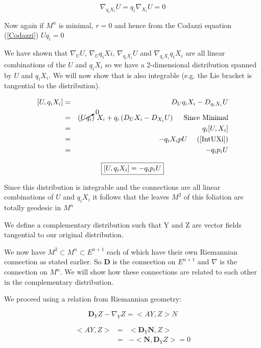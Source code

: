 \begin{equation}
\nabla_{q_iX_i}U = q_i\nabla_{X_i}U = 0
\label{NqiXiU}
\end{equation}

Now again if $M^n$ is minimal, $r=0$ and hence from the Codazzi equation (\ref{Codazzi}) $Uq_i=0$ 

We have shown that $\nabla_UU$, $\nabla_Uq_iXi$, $\nabla_{q_iX_i}U$ and $\nabla_{ q_iX_i}q_iX_i$ are all linear combinations of the $U$ and $q_iX_i$ so we have a 2-dimensional distribution spanned by $U$ and $q_iX_i$. We will now show that is also integrable (e.g. the Lie bracket is tangential to the distribution).

\begin{eqnarray}
\nonumber
[U,q_iX_i] &=& D_Uq_iX_i - D_{q_iX_i}U \\
\nonumber
&=& (\cancelto{0}{Uq_i})\ X_i+q_i\left(D_UX_i-D_{X_i}U\right) \mbox{\ \ \ \ Since Minimal} \\
\nonumber
&=& q_i[U,X_i] \\
\nonumber
&=& -q_iX_ipU \mbox{\ \ \ \ (\ref{IntUXi})} \\
\nonumber
&=& -q_ip_iU
\end{eqnarray}

\begin{equation}
\framebox{$[U,q_iX_i]=-q_ip_iU$}
\label{IntUqiXi}
\end{equation}

Since this distribution is integrable and the connections are all linear combinations of $U$ and $q_iX_i$ it follows that the leaves $M^2$ of this foliation are totally geodesic in $M^n$

We define a complementary distribution such that Y and Z are vector fields tangential to our original distribution.

We now have $M^2 \subset M^n \subset E^{n+1}$ each of which have their own Riemannian connection as stated earlier. So $\mathbf D$ is the connection on $E^{n+1}$ and $\nabla$ is the connection on $M^n$. We will show how these connections are related to each other in the complementary distribution.

We proceed using a relation from Riemannian geometry:

\begin{equation}
\mathbf D_YZ-\nabla_YZ=<AY,Z>N
\end{equation}

\begin{eqnarray}
\nonumber
<AY,Z> &=& <\mathbf D_Y\mathbf N, Z> \\ 
\nonumber
&=& -<\mathbf N, \mathbf D_YZ> = 0 
\end{eqnarray}


